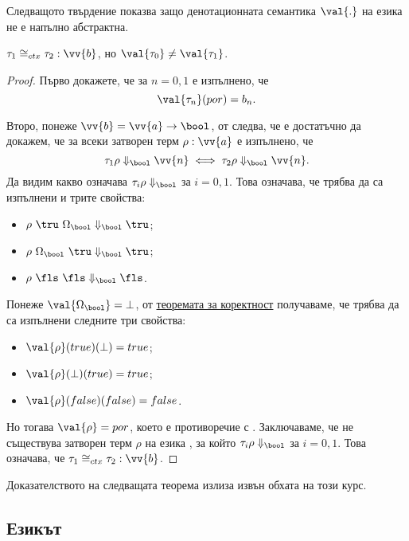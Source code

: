 Следващото твърдение показва защо денотационната семантика $\val{.}$ на езика \PCFPP не е напълно абстрактна.
\begin{framed}
\begin{proposition}
  $\tau_1 \cong_{ctx} \tau_2 : \vv{b}$, но $\val{\tau_0} \neq \val{\tau_1}$.
\end{proposition}  
\end{framed}
\begin{proof}
  Първо докажете, че за $n = 0,1$ е изпълнено, че
  \[\val{\tau_n}(por) = b_n.\]  
  
  Второ, понеже $\vv{b} = \vv{a} \to \bool$, от  следва, че е достатъчно да докажем, че
  за всеки затворен терм $\rho:\vv{a}$ е изпълнено, че
  \[\tau_1\rho \Downarrow_{\bool} \vv{n} \iff \tau_2\rho \Downarrow_{\bool} \vv{n}.\]
  Да видим какво означава $\tau_i \rho \Downarrow_{\bool}$ за $i = 0,1$.
  Това означава, че трябва да са изпълнени и трите свойства:
  \begin{itemize}
  \item
    $\rho\ \tru\ \Omega_{\bool} \Downarrow_{\bool} \tru$;%
  \item
    $\rho\ \Omega_{\bool}\ \tru \Downarrow_{\bool} \tru$;%
  \item
    $\rho\ \fls\ \fls \Downarrow_{\bool} \fls$.
  \end{itemize}
  Понеже $\val{\Omega_{\bool}} = \bot$, от \hyperref[th:pcf:soundness]{теоремата за коректност} получаваме, че трябва да са изпълнени следните три свойства:
  \begin{itemize}
  \item
    $\val{\rho}(true)(\bot) = true$;
  \item
    $\val{\rho}(\bot)(true) = true$;
  \item
    $\val{\rho}(false)(false) = false$.
  \end{itemize}
  Но тогава $\val{\rho} = por$, което е противоречие с .
  Заключаваме, че не съществува затворен терм $\rho$ на езика \PCFPP, за който $\tau_i\rho\Downarrow_\bool$ за $i = 0,1$. Това означава, че $\tau_1 \cong_{ctx} \tau_2 : \vv{b}$.
\end{proof}

Доказателството на следващата теорема излиза извън обхата на този курс.


\subsection{Езикът \PCFPOR}

